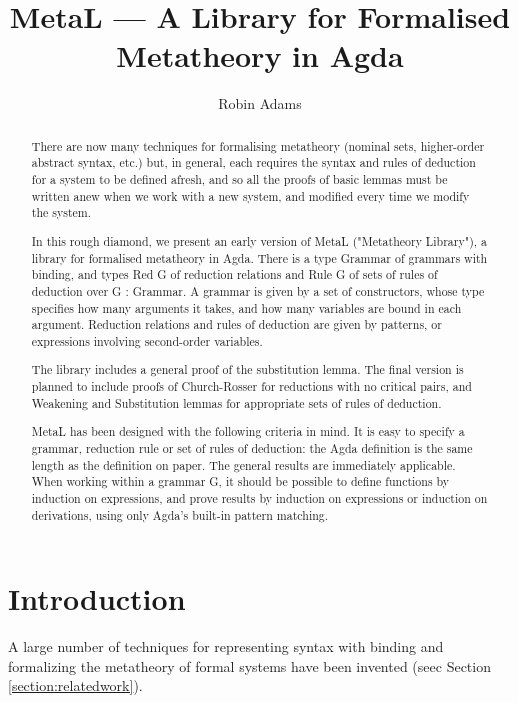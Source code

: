 \documentclass[envcountsame]{llncs}
\title{MetaL --- A Library for Formalised Metatheory in Agda}
\author{Robin Adams\inst{1}}
\institute{University of Bergen \email{r.adams@ii.uib.no}}
\begin{document}
\maketitle

\begin{abstract}
There are now many techniques for formalising metatheory (nominal sets, higher-order abstract syntax, etc.) but, in general, each requires the syntax and 
rules of deduction for a system to be defined afresh, and so all the proofs of basic lemmas must be written anew when we work with a new system, and
modified every time we modify the system. 

In this rough diamond, we present an early version of MetaL ("Metatheory Library"), a library for formalised metatheory in Agda. There is a type Grammar of 
grammars with binding, and types Red G of reduction relations and Rule G of sets of rules of deduction over G : Grammar. A grammar is given by a set of constructors, 
whose type specifies how many arguments it takes, and how many variables are bound in each argument. Reduction relations and rules of deduction are given by patterns,
or expressions involving second-order variables. 

The library includes a general proof of the substitution lemma. The final version is planned to include proofs of Church-Rosser for reductions with no critical pairs,
and Weakening and Substitution lemmas for appropriate sets of rules of deduction. 

MetaL has been designed with the following criteria in mind. It is easy to specify a grammar, reduction rule or set of rules of deduction: the Agda definition is the 
same length as the definition on paper. The general results are immediately applicable. When working within a grammar G, it should be possible to define functions by 
induction on expressions, and prove results by induction on expressions or induction on derivations, using only Agda's built-in pattern matching.
\end{abstract}


\section{Introduction}

A large number of techniques for representing syntax with binding and formalizing the metatheory of formal systems have been invented (seec Section \ref{section:relatedwork}).


\end{document}
